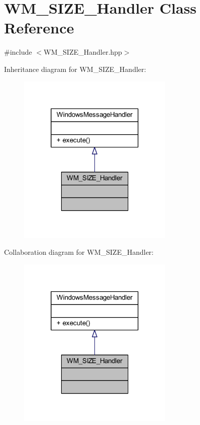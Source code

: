 \hypertarget{class_w_m___s_i_z_e___handler}{}\section{W\+M\+\_\+\+S\+I\+Z\+E\+\_\+\+Handler Class Reference}
\label{class_w_m___s_i_z_e___handler}


{\ttfamily \#include $<$W\+M\+\_\+\+S\+I\+Z\+E\+\_\+\+Handler.\+hpp$>$}



Inheritance diagram for W\+M\+\_\+\+S\+I\+Z\+E\+\_\+\+Handler\+:\nopagebreak
\begin{figure}[H]
\begin{center}
\leavevmode
\includegraphics[width=209pt]{class_w_m___s_i_z_e___handler__inherit__graph}
\end{center}
\end{figure}


Collaboration diagram for W\+M\+\_\+\+S\+I\+Z\+E\+\_\+\+Handler\+:\nopagebreak
\begin{figure}[H]
\begin{center}
\leavevmode
\includegraphics[width=209pt]{class_w_m___s_i_z_e___handler__coll__graph}
\end{center}
\end{figure}
